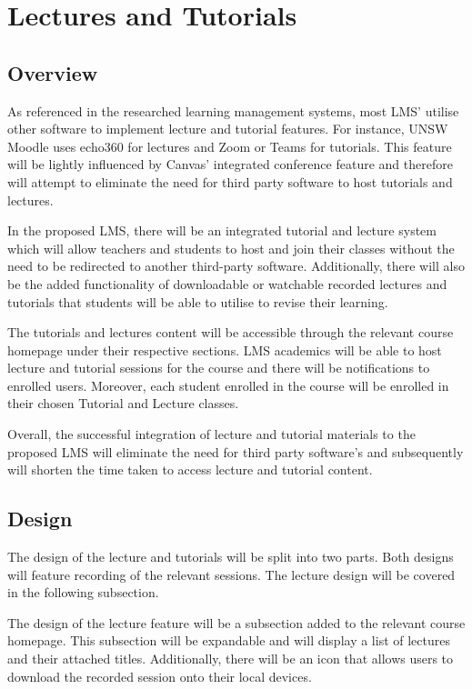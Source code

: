 \section{Lectures and Tutorials}
\subsection{Overview}
As referenced in the researched learning management systems, most LMS’ utilise other software to implement lecture and tutorial features. For instance, UNSW Moodle uses 
echo360 for lectures and Zoom or Teams for tutorials. This feature will be lightly influenced by Canvas’ integrated conference feature and therefore will attempt to 
eliminate the need for third party software to host tutorials and lectures. 

In the proposed LMS, there will be an integrated tutorial and lecture system which will allow teachers and students to host and join their classes without the need to 
be redirected to another third-party software. Additionally, there will also be the added functionality of downloadable or watchable recorded lectures and tutorials  
that students will be able to utilise to revise their learning. 

The tutorials and lectures content will be accessible through the relevant course homepage under their respective sections. LMS academics will be able to host lecture 
and tutorial sessions for the course and there will be notifications to enrolled users. Moreover, each student enrolled in the course will be enrolled in their chosen 
Tutorial and Lecture classes. 

Overall, the successful integration of lecture and tutorial materials to the proposed LMS will eliminate the need for third party software’s and subsequently will shorten 
the time taken to access lecture and tutorial content.

\subsection{Design}
The design of the lecture and tutorials will be split into two parts. Both designs will feature recording of the relevant sessions. The lecture design will be 
covered in the following subsection. 

The design of the lecture feature will be a subsection added to the relevant course homepage. This subsection will be expandable and will display a list of lectures 
and their attached titles. Additionally, there will be an icon that allows users to download the recorded session onto their local devices.

